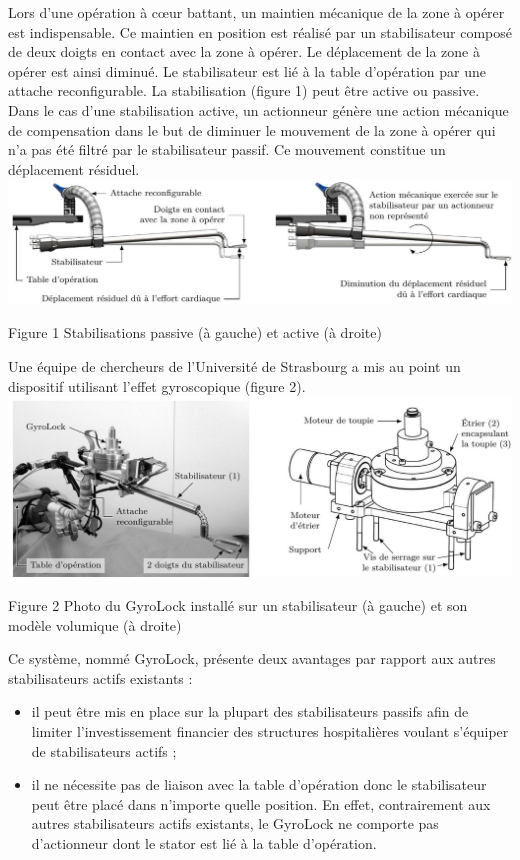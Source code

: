 \documentclass[10pt]{article}
\begin{document}
Lors d'une opération à cœur battant, un maintien mécanique de la zone à opérer est indispensable. Ce maintien en position est réalisé par un stabilisateur composé de deux doigts en contact avec la zone à opérer. Le déplacement de la zone à opérer est ainsi diminué. Le stabilisateur est lié à la table d'opération par une attache reconfigurable. La stabilisation (figure 1) peut être active ou passive. Dans le cas d'une stabilisation active, un actionneur génère une action mécanique de compensation dans le but de diminuer le mouvement de la zone à opérer qui n'a pas été filtré par le stabilisateur passif. Ce mouvement constitue un déplacement résiduel.
\includegraphics[max width=\textwidth, center]{2023_07_26_54f5e859400a10e656ddg-01(1)}

Figure 1 Stabilisations passive (à gauche) et active (à droite)

Une équipe de chercheurs de l'Université de Strasbourg a mis au point un dispositif utilisant l'effet gyroscopique (figure 2).
\includegraphics[max width=\textwidth, center]{2023_07_26_54f5e859400a10e656ddg-01(2)}

Figure 2 Photo du GyroLock installé sur un stabilisateur (à gauche) et son modèle volumique (à droite)

Ce système, nommé GyroLock, présente deux avantages par rapport aux autres stabilisateurs actifs existants :

\begin{itemize}
  \item il peut être mis en place sur la plupart des stabilisateurs passifs afin de limiter l'investissement financier des structures hospitalières voulant s'équiper de stabilisateurs actifs ;

  \item il ne nécessite pas de liaison avec la table d'opération donc le stabilisateur peut être placé dans n'importe quelle position. En effet, contrairement aux autres stabilisateurs actifs existants, le GyroLock ne comporte pas d'actionneur dont le stator est lié à la table d'opération.

\end{itemize}
\end{document}
